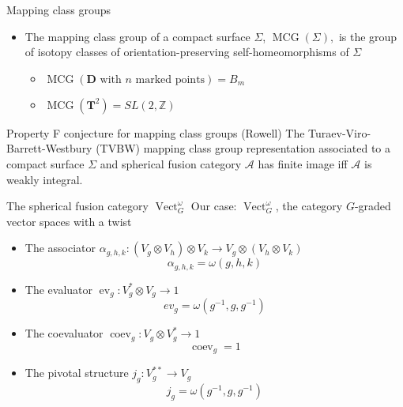 \documentclass[final,t, mathserif]{beamer}
\title{\huge }
\author{Paul Gustafson}
\institute{Texas A\&M University}
\DeclareMathOperator{\ev}{ev}
\DeclareMathOperator{\coev}{coev}
\DeclareMathOperator{\MCG}{MCG}
\DeclareMathOperator{\Vect}{Vect}
\theoremstyle{plain}
\theoremstyle{definition}
\begin{document}

\begin{frame}{} 
  \begin{columns}[t]
    
\begin{column}{.3\linewidth}


  \begin{block}{Mapping class groups}

    \begin{itemize}
    
\item
   The mapping class group of a compact surface $\Sigma$, 
   $\MCG(\Sigma),$
   is the group of isotopy classes of orientation-preserving self-homeomorphisms of $\Sigma$ 
  \begin{itemize}
    \item $\MCG(\mathbf{D} \text{ with } n \text{ marked points}) = B_m$
    \item $\MCG(\mathbf{T}^2) = SL(2,\mathbb Z)$
  \end{itemize}
\end{itemize}
\end{block}



\begin{block}{Property F conjecture for mapping class groups (Rowell)}
The Turaev-Viro-Barrett-Westbury (TVBW) mapping class group representation associated to a compact surface $\Sigma$ and spherical fusion category $\mathcal A$ has finite image iff $\mathcal A$ is weakly integral.
\end{block}


\begin{block}{The spherical fusion category $\Vect^\omega_G$}
  Our case: $\Vect^\omega_G$, the category $G$-graded vector spaces with a twist
\begin{itemize} 
\item The associator $\alpha_{g,h,k}:(V_g \otimes V_h) \otimes V_k \to V_g \otimes (V_h \otimes V_k)$
            $$ \alpha_{g,h,k} = \omega(g,h,k)$$
\item The evaluator $\ev_g:V_g^* \otimes V_g \to 1$
  $$ ev_g = \omega(g^{-1},g,g^{-1})$$
\item The coevaluator $\coev_g:V_g \otimes V_g^* \to 1$
    $$\coev_g = 1$$
\item The pivotal structure $j_g:V_g^{**} \to V_g$
            $$ j_g = \omega(g^{-1},g,g^{-1})$$
\end{itemize}


\end{block}
\end{column}
\end{columns}
\end{frame}
\end{document}
